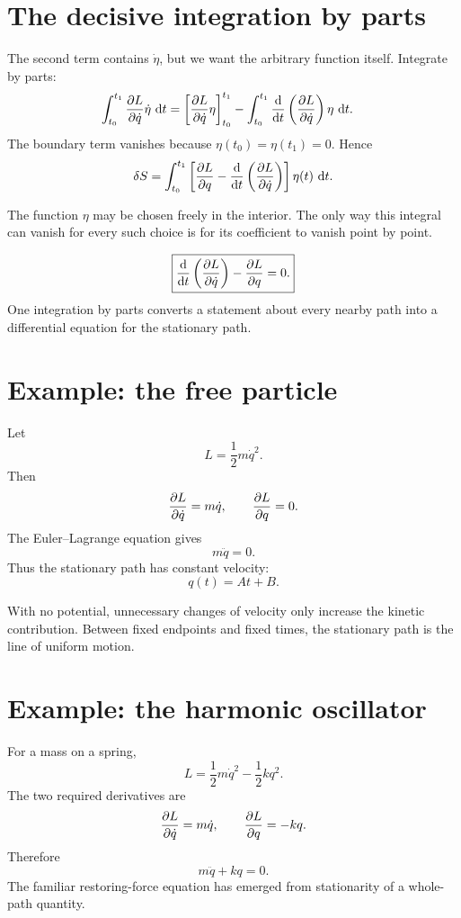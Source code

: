 \documentclass[11pt,a4paper]{article}
\begin{document}
\section{The decisive integration by parts}

The second term contains $\dot\eta$, but we want the arbitrary function itself. Integrate by parts:
\begin{align*}
\int_{t_0}^{t_1}\frac{\partial L}{\partial \dot q}\dot\eta\,\mathop{}\!\mathrm d t
&=\left[\frac{\partial L}{\partial \dot q}\eta\right]_{t_0}^{t_1}
-\int_{t_0}^{t_1}\frac{\mathop{}\!\mathrm d }{\mathop{}\!\mathrm d t}\left(\frac{\partial L}{\partial \dot q}\right)\eta\,\mathop{}\!\mathrm d t.
\end{align*}
The boundary term vanishes because $\eta(t_0)=\eta(t_1)=0$. Hence
\[
\delta S=\int_{t_0}^{t_1}
\left[
\frac{\partial L}{\partial q}-\frac{\mathop{}\!\mathrm d }{\mathop{}\!\mathrm d t}\left(\frac{\partial L}{\partial \dot q}\right)
\right]\eta(t)\,\mathop{}\!\mathrm d t.
\]

The function $\eta$ may be chosen freely in the interior. The only way this integral can vanish for every such choice is for its coefficient to vanish point by point.

\begin{resultbox}
\[
\boxed{\frac{\mathop{}\!\mathrm d }{\mathop{}\!\mathrm d t}\left(\frac{\partial L}{\partial \dot q}\right)-\frac{\partial L}{\partial q}=0.}
\]
One integration by parts converts a statement about every nearby path into a differential equation for the stationary path.
\end{resultbox}

\section{Example: the free particle}

Let
\[
L=\frac12m\dot q^2.
\]
Then
\[
\frac{\partial L}{\partial \dot q}=m\dot q,
\qquad
\frac{\partial L}{\partial q}=0.
\]
The Euler--Lagrange equation gives
\[
m\ddot q=0.
\]
Thus the stationary path has constant velocity:
\[
q(t)=At+B.
\]

\begin{intuition}
With no potential, unnecessary changes of velocity only increase the kinetic contribution. Between fixed endpoints and fixed times, the stationary path is the line of uniform motion.
\end{intuition}

\section{Example: the harmonic oscillator}

For a mass on a spring,
\[
L=\frac12m\dot q^2-\frac12kq^2.
\]
The two required derivatives are
\[
\frac{\partial L}{\partial \dot q}=m\dot q,
\qquad
\frac{\partial L}{\partial q}=-kq.
\]
Therefore
\[
\boxed{m\ddot q+kq=0.}
\]
The familiar restoring-force equation has emerged from stationarity of a whole-path quantity.
\end{document}
